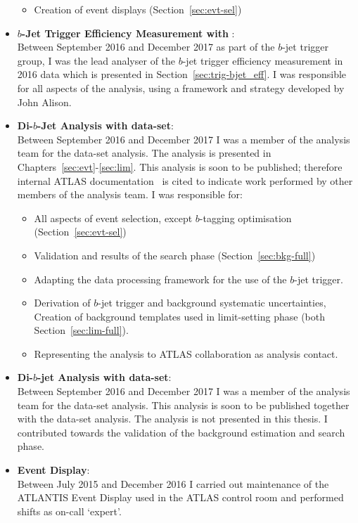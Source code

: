 \begin{itemize}[leftmargin=*]
\begin{itemize}
    \item Creation of event displays (Section~\ref{sec:evt-sel})
  \end{itemize}
  \vspace{1em}
\item\textbf{$b$-Jet Trigger Efficiency Measurement  with \lm{}}:\\
  Between September 2016 and December 2017 as part of the $b$-jet trigger group,
  I was the lead analyser of the $b$-jet trigger efficiency measurement in 2016 data which is presented in Section~\ref{sec:trig-bjet_eff}.
  I was responsible for all aspects of the analysis, using a framework and strategy developed by John Alison.
  \vspace{1em}
\item\textbf{Di-$b$-Jet Analysis  with \lm{} data-set}:\\ 
  Between September 2016 and December 2017 I was a member of the analysis team for the \lm{} data-set analysis.
  The analysis is presented in Chapters~\ref{sec:evt}-\ref{sec:lim}.
  This analysis is soon to be published; therefore internal ATLAS documentation~\cite{dibjet-full_int} is cited to indicate work performed by other members of the analysis team.
  I was responsible for:
  \begin{itemize}
    \item All aspects of event selection, except $b$-tagging optimisation (Section~\ref{sec:evt-sel})
    \item Validation and results of the search phase (Section~\ref{sec:bkg-full})
    \item Adapting the data processing framework for the use of the $b$-jet trigger.
    \item Derivation of $b$-jet trigger and background systematic uncertainties,\\
      Creation of background templates used in limit-setting phase (both Section~\ref{sec:lim-full}).
    \item Representing the analysis to ATLAS collaboration as analysis contact.
  \end{itemize}
  \vspace{1em}
\item\textbf{Di-$b$-jet Analysis  with \hm{} data-set}: \\
  Between September 2016 and December 2017 I was a member of the analysis team for the \hm{} data-set analysis.
  This analysis is soon to be published together with the \lm{} data-set analysis.
  The analysis is not presented in this thesis.
  I contributed towards the validation of the background estimation and search phase.\vspace{1em}
\item\textbf{Event Display}: \\
  Between July 2015 and December 2016 I carried out maintenance of the {\sc ATLANTIS} Event Display used in the ATLAS control room
  and performed shifts as on-call `expert'.
\end{itemize}







